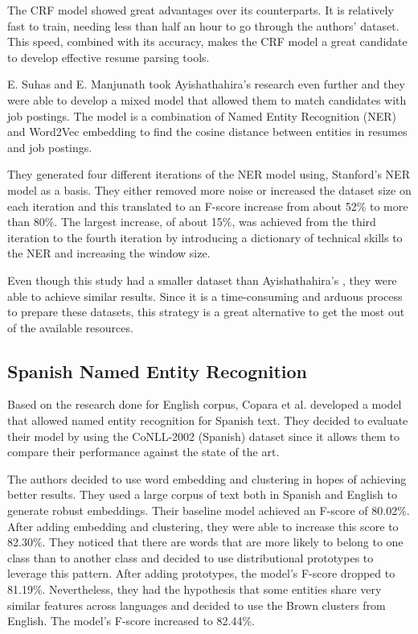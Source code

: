   The CRF model showed great advantages over its counterparts. It is relatively
  fast to train, needing less than half an hour to go through the authors'
  dataset. This speed, combined with its accuracy, makes the CRF model a great
  candidate to develop effective resume parsing tools.

  \medskip
  E. Suhas and E. Manjunath \cite{E*2020} took Ayishathahira's
  \cite{Ayishathahira2018a} research even further and they were able to develop
  a mixed model that allowed them to match candidates with job postings. The
  model is a combination of Named Entity Recognition (NER) and Word2Vec
  embedding to find the cosine distance between entities in resumes and job
  postings.

  They generated four different iterations of the NER model using, Stanford's
  NER model as a basis. They either removed more noise or increased the dataset
  size on each iteration and this translated to an F-score increase from about
  52\% to more than 80\%. The largest increase, of about 15\%, was achieved
  from the third iteration to the fourth iteration by introducing a dictionary
  of technical skills to the NER and increasing the window size.

  Even though this study had a smaller dataset than Ayishathahira's
  \cite{Ayishathahira2018a}, they were able to achieve similar results. Since
  it is a time-consuming and arduous process to prepare these datasets, this
  strategy is a great alternative to get the most out of the available
  resources.

  \subsection{Spanish Named Entity Recognition}
  Based on the research done for English corpus, Copara et al.
  \cite{Copara2016} developed a model that allowed named entity recognition for
  Spanish text. They decided to evaluate their model by using the CoNLL-2002
  (Spanish) dataset since it allows them to compare their performance against
  the state of the art.

  The authors decided to use word embedding and clustering in hopes of
  achieving better results. They used a large corpus of text both in Spanish
  and English to generate robust embeddings. Their baseline model achieved an
  F-score of 80.02\%. After adding embedding and clustering, they were able to
  increase this score to 82.30\%. They noticed that there are words that are
  more likely to belong to one class than to another class and decided to use
  distributional prototypes to leverage this pattern. After adding prototypes,
  the model's F-score dropped to 81.19\%. Nevertheless, they had the hypothesis
  that some entities share very similar features across languages and decided
  to use the Brown clusters from English. The model's F-score increased to
  82.44\%.

